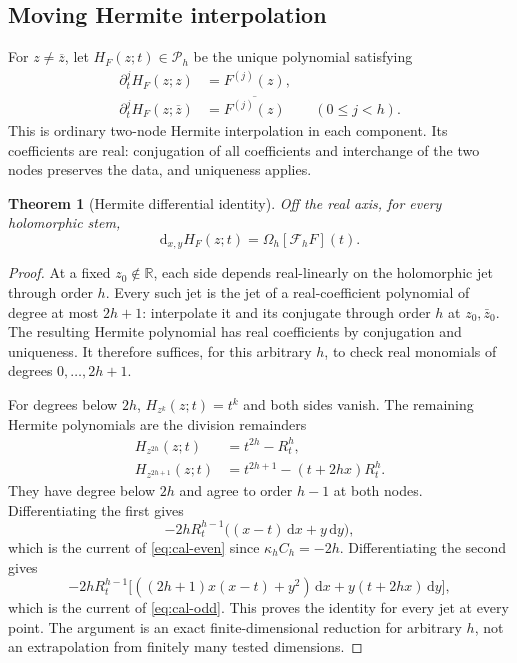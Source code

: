 \documentclass[11pt,a4paper]{article}
\numberwithin{equation}{section}
\newtheorem{theorem}{Theorem}[section]
\theoremstyle{definition}
\theoremstyle{remark}
\newcommand{\R}{\mathbb R}
\newcommand{\dd}{\,\mathrm d}
\newcommand{\Fu}{\mathcal F_h}
\newcommand{\Pspace}{\mathscr P_h}
\newcommand{\barz}{\overline z}
\begin{document}
\subsection{Moving Hermite interpolation}

For $z\ne\barz$, let $H_F(z;t)\in\Pspace$ be the unique polynomial satisfying
\begin{align}
 \partial_t^jH_F(z;z)&=F^{(j)}(z),\label{eq:Hermite-jets}\\
 \partial_t^jH_F(z;\barz)&=\overline{F^{(j)}(z)}
                    &&(0\le j<h).\nonumber
\end{align}
This is ordinary two-node Hermite interpolation in each component. Its
coefficients are real: conjugation of all coefficients and interchange of
the two nodes preserves the data, and uniqueness applies.

\begin{theorem}[Hermite differential identity]\label{thm:Hermite}
Off the real axis, for every holomorphic stem,
\begin{equation}\label{eq:Hermite-identity}
 \mathrm d_{x,y}H_F(z;t)=\Omega_h[\Fu F](t).
\end{equation}
\end{theorem}
\begin{proof}
At a fixed $z_0\notin\R$, each side depends real-linearly on the holomorphic
jet through order $h$. Every such jet is the jet of a real-coefficient
polynomial of degree at most $2h+1$: interpolate it and its conjugate through
order $h$ at $z_0,\bar z_0$. The resulting Hermite polynomial has real
coefficients by conjugation and uniqueness. It therefore suffices, for this
arbitrary $h$, to check real monomials of degrees $0,\ldots,2h+1$.

For degrees below $2h$, $H_{z^k}(z;t)=t^k$ and both sides vanish. The remaining
Hermite polynomials are the division remainders
\begin{align}
 H_{z^{2h}}(z;t)&=t^{2h}-R_t^h,\label{eq:rem-even}\\
 H_{z^{2h+1}}(z;t)&=t^{2h+1}-(t+2hx)R_t^h.\label{eq:rem-odd}
\end{align}
They have degree below $2h$ and agree to order $h-1$ at both nodes.
Differentiating the first gives
\[
 -2hR_t^{h-1}\bigl((x-t)\dd x+y\dd y\bigr),
\]
which is the current of \eqref{eq:cal-even} since $\kappa_hC_h=-2h$.
Differentiating the second gives
\[
 -2hR_t^{h-1}\bigl[
 ((2h+1)x(x-t)+y^2)\dd x+y(t+2hx)\dd y\bigr],
\]
which is the current of \eqref{eq:cal-odd}. This proves the identity for every
jet at every point. The argument is an exact finite-dimensional reduction
for arbitrary $h$, not an extrapolation from finitely many tested dimensions.
\end{proof}
\end{document}
